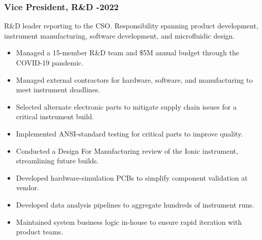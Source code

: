 \documentclass{res}
\begin{document}
\begin{resume}
    \subsubsection{Vice President, R\&D -2022}
      \vspace{-0.2in}
      R\&D leader reporting to the CSO. Responsibility spanning product development, instrument
      manufacturing, software development, and microfluidic design.
      \vspace{0.1in}
       \begin{itemize}
        \item Managed a 15-member R\&D team and \$5M annual budget through the COVID-19 pandemic.
        \item Managed external contractors for hardware, software, and manufacturing to meet instrument deadlines.
        \item Selected alternate electronic parts to mitigate supply chain issues for a critical instrument build.
        \item Implemented ANSI-standard testing for critical parts to improve quality.
        \item Conducted a Design For Manufacturing review of the Ionic instrument, streamlining future builds.
        \item Developed hardware-simulation PCBs to simplify component validation at vendor.
        \item Developed data analysis pipelines to aggregate hundreds of instrument runs.
        \item Maintained system business logic in-house to ensure rapid iteration with product teams.
       \end{itemize}

      \vspace{-0.2in}

\end{resume}
\end{document}
